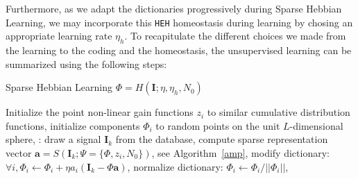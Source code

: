 \documentclass[draft]{article} %
\newcommand{\coef}{\mathbf{a}} %
\newcommand{\image}{\mathbf{I}} %
\newcommand{\dico}{\Phi} %
\newcommand{\norm}[1]{|\!| #1 |\!|}
\newcommand{\seeEq}[1]{Eq.~\ref{eq:#1}}%
\begin{document}
Furthermore, as we adapt the dictionaries progressively during Sparse Hebbian Learning, we may incorporate this \texttt{HEH} homeostasis during learning by chosing an appropriate learning rate $\eta_h$.
To recapitulate the different choices we made from the learning to the coding and the homeostasis, the unsupervised learning can be summarized using the following steps:
\begin{algorithm}
\caption{Sparse Hebbian Learning  $\dico = H(\image; \eta, \eta_h, N_0)$}\label{shl}
\begin{algorithmic}[1]
\State Initialize the point non-linear gain functions $z_i$ to similar cumulative distribution functions,%
\State initialize components $\dico_i$ to random points on the unit $L$-dimensional sphere,
:
\State draw a signal $\image_k$ from the database,%
\State compute sparse representation vector $\coef = S(\image_k; \Psi=\{\dico, z_i, N_0\})$, see Algorithm~\ref{amp},
\State modify dictionary: $\forall i, \dico_{i} \leftarrow \dico_{i} + \eta a_{i} (\image_k - \dico\coef)$,%
\State normalize dictionary: $\dico_{i} \leftarrow \dico_{i} / \norm{\dico_{i}}$,%
\EndFor
\end{algorithmic}
\end{algorithm}
%
\end{document}
